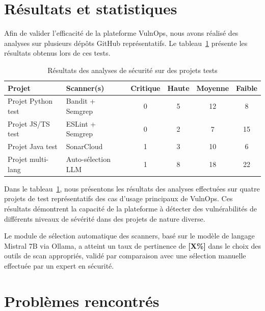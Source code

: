 \documentclass[12pt, a4paper, oneside]{report}
\begin{document}
\section{Résultats et statistiques}
\label{sec:resultats}

Afin de valider l'efficacité de la plateforme VulnOps, nous avons réalisé
des analyses sur plusieurs dépôts GitHub représentatifs. Le tableau~\ref{tab:resultats}
présente les résultats obtenus lors de ces tests.

\begin{table}[H]
    \centering
    \caption{Résultats des analyses de sécurité sur des projets tests}
    \label{tab:resultats}
    \begin{tabularx}{\textwidth}{|l|l|c|c|c|c|}
        \hline
        \textbf{Projet} & \textbf{Scanner(s)} & \textbf{Critique} & \textbf{Haute} & \textbf{Moyenne} & \textbf{Faible} \\
        \hline
        Projet Python test & Bandit + Semgrep & 0 & 5 & 12 & 8 \\
        \hline
        Projet JS/TS test & ESLint + Semgrep & 0 & 2 & 7 & 15 \\
        \hline
        Projet Java test & SonarCloud & 1 & 3 & 10 & 6 \\
        \hline
        Projet multi-lang & Auto-sélection LLM & 1 & 8 & 18 & 22 \\
        \hline
    \end{tabularx}
\end{table}

Dans le tableau~\ref{tab:resultats}, nous présentons les résultats des analyses
effectuées sur quatre projets de test représentatifs des cas d'usage principaux
de VulnOps. Ces résultats démontrent la capacité de la plateforme à détecter
des vulnérabilités de différents niveaux de sévérité dans des projets de
nature diverse.

Le module de sélection automatique des scanners, basé sur le modèle de langage
Mistral 7B via Ollama, a atteint un taux de pertinence de \textbf{[X\%]}
dans le choix des outils de scan appropriés, validé par comparaison avec
une sélection manuelle effectuée par un expert en sécurité.

\section{Problèmes rencontrés}
\label{sec:problemes}
\end{document}
